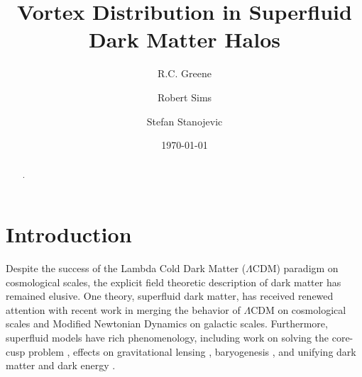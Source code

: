 \documentclass[aps,prd,twocolumn,nofootinbib,superscriptaddress]{revtex4-1}
\begin{document}
\title{Vortex Distribution in Superfluid Dark Matter Halos}

\author{R.C. Greene}
\affiliation{}
\author{Robert Sims}
\author{Stefan Stanojevic}


\begin{abstract}
.
\end{abstract}


\date{\today}

\maketitle



\section{Introduction}

Despite the success of the Lambda Cold Dark Matter ($\Lambda$CDM) paradigm on cosmological scales, the explicit field theoretic description of dark matter has remained elusive.  One theory, superfluid dark matter, has received renewed attention with recent work \cite{Berezhiani:2015bqa,Berezhiani:2015pia} in merging the behavior of $\Lambda$CDM on cosmological scales and Modified Newtonian Dynamics on galactic scales.  Furthermore, superfluid models have rich phenomenology, including work on solving the core-cusp problem \cite{Deng:2018jjz}, effects on gravitational lensing \cite{Hossenfelder:2018iym}, baryogenesis \cite{Alexander:2018fjp}, and unifying dark matter and dark energy \cite{Ferreira:2018wup}.
\end{document}
